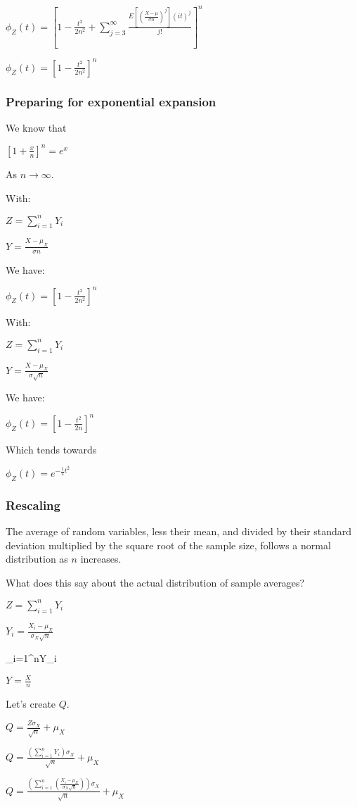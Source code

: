 \(\phi_Z(t)=[1-\frac{t^2}{2n^2} +\sum_{j=3}^{\infty }\frac{E[(\frac{X-\mu}{\sigma n})^j](it)^j}{j!}]^n\)

\(\phi_Z(t)=[1-\frac{t^2}{2n^2}]^n\)

\subsubsection{Preparing for exponential expansion}

We know that

\([1+\frac{x}{n}]^n=e^x\)

As \(n \rightarrow \infty\).

With:

\(Z=\sum_{i=1}^nY_i\)

\(Y=\frac{X-\mu_X }{\sigma n}\)

We have:

\(\phi_Z(t)=[1-\frac{t^2}{2n^2}]^n\)

With:

\(Z=\sum_{i=1}^nY_i\)

\(Y=\frac{X-\mu_X }{\sigma \sqrt n}\)

We have:

\(\phi_Z(t)=[1-\frac{t^2}{2n}]^n\)

Which tends towards

\(\phi_Z(t)=e^{-\frac{1}{2}t^2}\)

\subsubsection{Rescaling}

The average of random variables, less their mean, and divided by their standard deviation multiplied by the square root of the sample size, follows a normal distribution as \(n\) increases.

What does this say about the actual distribution of sample averages?

\(Z=\sum_{i=1}^nY_i\)

\(Y_i=\frac{X_i-\mu_X }{\sigma_X \sqrt n}\)

\sum_{i=1}^nY_i

\(Y=\frac{X}{n}\)

Let's create \(Q\).

\(Q=\frac{Z\sigma_X }{\sqrt n}+\mu_X\)

\(Q=\frac{(\sum_{i=1}^nY_i)\sigma_X }{\sqrt n}+\mu_X\)

\(Q=\frac{(\sum_{i=1}^n(\frac{X_i-\mu_X }{\sigma_X \sqrt n}))\sigma_X }{\sqrt n}+\mu_X\)

